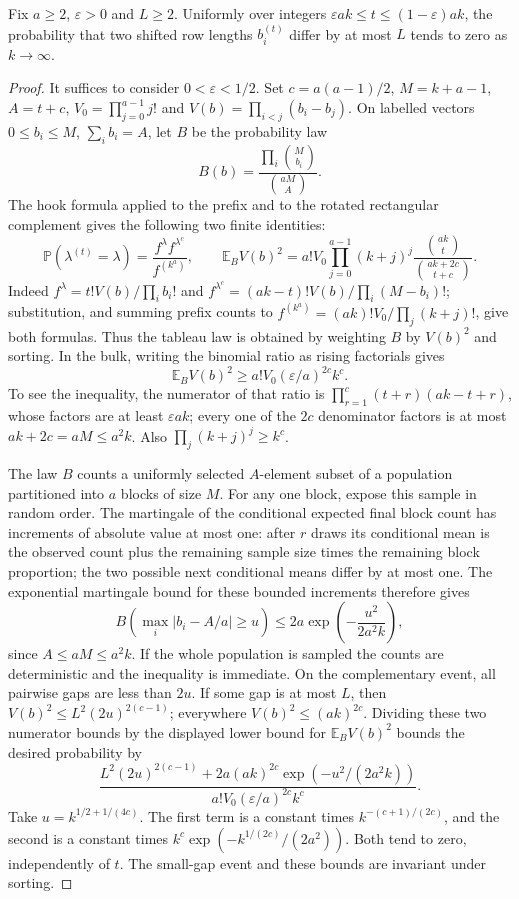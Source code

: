 \begin{lemma}
\label{lem:specht-bulk-separation}
\leanok
Fix $a\ge2$, $\varepsilon>0$ and $L\ge2$. Uniformly over integers
$\varepsilon ak\le t\le(1-\varepsilon)ak$, the probability that two
shifted row lengths $b_i^{(t)}$ differ by at most $L$ tends to zero as
$k\to\infty$.
\end{lemma}
\begin{proof}
It suffices to consider $0<\varepsilon<1/2$. Set
$c=a(a-1)/2$, $M=k+a-1$, $A=t+c$, $V_0=\prod_{j=0}^{a-1}j!$ and
$V(b)=\prod_{i<j}(b_i-b_j)$. On labelled vectors
$0\le b_i\le M$, $\sum_i b_i=A$, let $B$ be the probability law
\[
 B(b)=\frac{\prod_i\binom M{b_i}}{\binom{aM}A}.
\]
The hook formula applied to the prefix and to the rotated rectangular
complement gives the following two finite identities:
\[
 \mathbb P(\lambda^{(t)}=\lambda)
       =\frac{f^\lambda f^{\lambda^c}}{f^{(k^a)}},\qquad
 \mathbb E_B V(b)^2
       =a!V_0\prod_{j=0}^{a-1}(k+j)^j
           \frac{\binom{ak}t}{\binom{ak+2c}{t+c}}.
\]
Indeed $f^\lambda=t!V(b)/\prod_i b_i!$ and
$f^{\lambda^c}=(ak-t)!V(b)/\prod_i(M-b_i)!$; substitution, and summing
prefix counts to $f^{(k^a)}=(ak)!V_0/\prod_j(k+j)!$, give both formulas.
Thus the tableau law is obtained by weighting $B$ by $V(b)^2$ and sorting.
In the bulk, writing the binomial ratio as rising factorials gives
\[
 \mathbb E_B V(b)^2\ge a!V_0(\varepsilon/a)^{2c}k^c.
\]
To see the inequality, the numerator of that ratio is
$\prod_{r=1}^c(t+r)(ak-t+r)$, whose factors are at least
$\varepsilon ak$; every one of the $2c$ denominator factors is at most
$ak+2c=aM\le a^2k$. Also $\prod_j(k+j)^j\ge k^c$.

The law $B$ counts a uniformly selected $A$-element subset of a population
partitioned into $a$ blocks of size $M$. For any one block, expose this
sample in random order. The martingale of the conditional expected final
block count has increments of absolute value at most one: after $r$
draws its conditional mean is the observed count plus the remaining
sample size times the remaining block proportion; the two possible
next conditional means differ by at most one. The exponential
martingale bound for these bounded increments therefore gives
\[
 B\!\left(\max_i|b_i-A/a|\ge u\right)
       \le2a\exp\left(-\frac{u^2}{2a^2k}\right),
\]
since $A\le aM\le a^2k$. If the whole population is sampled the counts
are deterministic and the inequality is immediate.
On the complementary event, all pairwise gaps are less than $2u$.
If some gap is at most $L$, then
$V(b)^2\le L^2(2u)^{2(c-1)}$; everywhere $V(b)^2\le(ak)^{2c}$.
Dividing these two numerator bounds by the displayed lower bound for
$\mathbb E_B V(b)^2$ bounds the desired probability by
\[
 \frac{L^2(2u)^{2(c-1)}
        +2a(ak)^{2c}\exp(-u^2/(2a^2k))}
      {a!V_0(\varepsilon/a)^{2c}k^c}.
\]
Take $u=k^{1/2+1/(4c)}$. The first term is a constant times
$k^{-(c+1)/(2c)}$, and the second is a constant times
$k^c\exp(-k^{1/(2c)}/(2a^2))$. Both tend to zero, independently of $t$.
The small-gap event and these bounds are invariant under sorting.
\end{proof}

